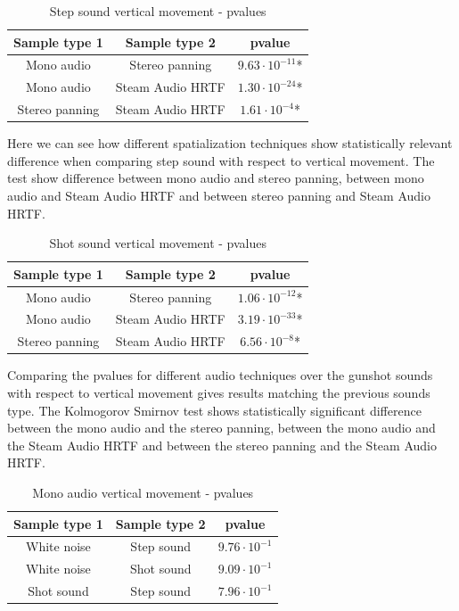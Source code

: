 \documentclass[conference]{IEEEtran}
\begin{document}
\begin{table}[htbp]
\caption{Step sound vertical movement - pvalues}
\begin{center}
\begin{tabular}{|c|c|c|}
\hline
\textbf{Sample type 1} & \textbf{Sample type 2} & \textbf{pvalue}\\
\hline
Mono audio & Stereo panning & $9.63 \cdot 10^{-11}$*\\
\hline
Mono audio & Steam Audio HRTF & $1.30 \cdot 10^{-24}$*\\
\hline
Stereo panning & Steam Audio HRTF & $1.61 \cdot 10^{-4}$*\\
\hline
\end{tabular}
\label{tab22}
\end{center}
\end{table}

Here we can see how different spatialization techniques show statistically relevant difference when comparing step sound with respect to vertical movement. The test show difference between mono audio and stereo panning, between mono audio and Steam Audio HRTF and between stereo panning and Steam Audio HRTF.

\begin{table}[htbp]
\caption{Shot sound vertical movement - pvalues}
\begin{center}
\begin{tabular}{|c|c|c|}
\hline
\textbf{Sample type 1} & \textbf{Sample type 2} & \textbf{pvalue}\\
\hline
Mono audio & Stereo panning & $1.06 \cdot 10^{-12}$*\\
\hline
Mono audio & Steam Audio HRTF & $3.19 \cdot 10^{-33}$*\\
\hline
Stereo panning & Steam Audio HRTF & $6.56 \cdot 10^{-8}$*\\
\hline
\end{tabular}
\label{tab32}
\end{center}
\end{table}

Comparing the pvalues for different audio techniques over the gunshot sounds with respect to vertical movement gives results matching the previous sounds type. The Kolmogorov Smirnov test shows statistically significant difference between the mono audio and the stereo panning, between the mono audio and the Steam Audio HRTF and between the stereo panning and the Steam Audio HRTF.

\begin{table}[htbp]
\caption{Mono audio vertical movement - pvalues}
\begin{center}
\begin{tabular}{|c|c|c|}
\hline
\textbf{Sample type 1} & \textbf{Sample type 2} & \textbf{pvalue}\\
\hline
White noise & Step sound & $9.76 \cdot 10^{-1}$\\
\hline
White noise & Shot sound & $9.09 \cdot 10^{-1}$\\
\hline
Shot sound & Step sound & $7.96 \cdot 10^{-1}$\\
\hline
\end{tabular}
\label{tab42}
\end{center}
\end{table}
\end{document}
